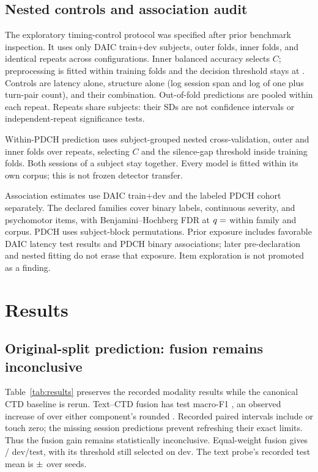 \documentclass{article}
\begin{document}
\subsection{Nested controls and association audit}
The exploratory timing-control protocol was specified after prior benchmark inspection. It uses only  DAIC train+dev subjects,  outer folds,  inner folds, and  identical repeats across configurations. Inner balanced accuracy selects $C$; preprocessing is fitted within training folds and the decision threshold stays at . Controls are latency alone, structure alone (log session span and log of one plus turn-pair count), and their combination. Out-of-fold predictions are pooled within each repeat. Repeats share subjects: their SDs are not confidence intervals or independent-repeat significance tests.

Within-PDCH prediction uses subject-grouped nested cross-validation,  outer and  inner folds over  repeats, selecting $C$ and the silence-gap threshold inside training folds. Both sessions of a subject stay together. Every model is fitted within its own corpus; this is not frozen detector transfer.

Association estimates use DAIC train+dev and the labeled PDCH cohort separately. The declared families cover binary labels, continuous severity, and psychomotor items, with Benjamini--Hochberg FDR at $q=\R{fdr}$ within family and corpus. PDCH uses  subject-block permutations. Prior exposure includes favorable DAIC latency test results and PDCH binary associations; later pre-declaration and nested fitting do not erase that exposure. Item exploration is not promoted as a finding.

\section{Results}
\subsection{Original-split prediction: fusion remains inconclusive}
Table~\ref{tab:results} preserves the recorded modality results while the canonical CTD baseline is rerun. Text--CTD fusion has test macro-F1 , an observed increase of  over either component's rounded . Recorded paired intervals include or touch zero; the missing session predictions prevent refreshing their exact limits. Thus the fusion gain remains statistically inconclusive. Equal-weight fusion gives / dev/test, with its threshold still selected on dev. The text probe's recorded test mean is $\R{robertaSeedmean}\pm\R{robertaSeedsd}$ over  seeds.
\end{document}

